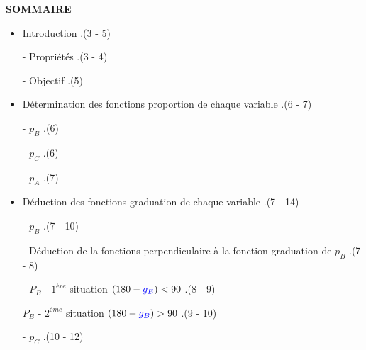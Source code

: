 \documentclass[10pt]{article}
\begin{document}
\newpage

\newcommand\kitty{\leavemode\xleaders\hbox{.}\hfill\kern0pt\vspace{0.15cm}}

\begin{center}

        \Large \textbf{SOMMAIRE} \normalsize

\end{center}

\vspace{1cm}

\begin{itemize}

        \item Introduction \kitty (3 - 5) 

        \hspace{1cm} - Propriétés \kitty (3 - 4)

        \hspace{1cm} - Objectif \kitty (5)

        \item  Détermination des fonctions proportion de chaque variable \kitty (6 - 7) 

        \hspace{1cm} - $p_{B}$ \kitty (6) 

        \hspace{1cm} - $p_{C}$ \kitty (6) 

        \hspace{1cm} - $p_{A}$ \kitty (7) 

        \item Déduction des fonctions graduation de chaque variable \kitty (7 - 14) 

        \hspace{1cm} - $p_{B}$ \kitty (7 - 10) 

        \hspace{2cm} - Déduction de la fonctions perpendiculaire à la fonction graduation de $p_{B}$ \kitty (7 - 8) 

        \hspace{2cm} - $P_{B}$ - $1^{ère}$ situation $(180 - \color{blue}g_{B}\color{black}) < 90$ \kitty (8 - 9) 

        \hspace{2cm} $P_{B}$ - $2^{ème}$ situation $(180 - \color{blue}g_{B}\color{black}) > 90$ \kitty (9 - 10) 
        
        \hspace{1cm} - $p_{C}$ \kitty (10 - 12) 


\end{itemize}
\end{document}
